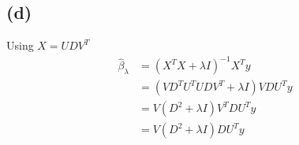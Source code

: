 \documentclass[pra,groupedaddress,amsmath,amssymb, column]{revtex4}
\begin{document}
\subsection*{(d)}
Using $X=UDV^T$
\begin{align}
\hat{\beta}_{\lambda}&=(X^TX +  \lambda I)^{-1}X^T y \nonumber\\
				       &=\left( VD^TU^TUDV^T  + \lambda I \right)VDU^T y \nonumber\\
                                      &=V\left(D^2 + \lambda I \right)V^TDU^T y \nonumber\\
                                      &=V\left(D^2 + \lambda I \right)DU^T y
\end{align}
\end{document}
